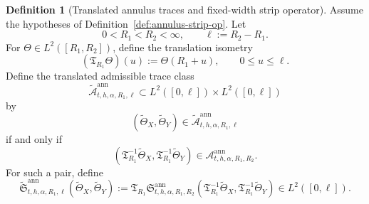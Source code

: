 \documentclass[11pt,a4paper]{amsart}
\theoremstyle{plain}
\theoremstyle{definition}
\newtheorem{definition}[theorem]{Definition}
\theoremstyle{remark}
\begin{document}
\begin{definition}[Translated annulus traces and fixed-width strip operator]
\label{def:annulus-normalized}
Assume the hypotheses of Definition~\ref{def:annulus-strip-op}. Let
\[
0<R_1<R_2<\infty,
\qquad
\ell:=R_2-R_1.
\]
For \(\Theta\in L^2([R_1,R_2])\), define the translation isometry
\[
(\mathfrak T_{R_1}\Theta)(u):=\Theta(R_1+u),
\qquad 0\le u\le \ell.
\]
Define the translated admissible trace class
\[
\widetilde{\mathcal A}_{t,h,\alpha,R_1,\ell}^{\mathrm{ann}}
\subset
L^2([0,\ell])\times L^2([0,\ell])
\]
by
\[
(\widetilde\Theta_X,\widetilde\Theta_Y)\in
\widetilde{\mathcal A}_{t,h,\alpha,R_1,\ell}^{\mathrm{ann}}
\]
if and only if
\[
(\mathfrak T_{R_1}^{-1}\widetilde\Theta_X,\mathfrak T_{R_1}^{-1}\widetilde\Theta_Y)
\in
\mathcal A_{t,h,\alpha,R_1,R_2}^{\mathrm{ann}}.
\]
For such a pair, define
\begin{equation}\label{eq:annulus-normalized-op}
\widetilde{\mathfrak S}_{t,h,\alpha,R_1,\ell}^{\mathrm{ann}}
(\widetilde\Theta_X,\widetilde\Theta_Y)
:=
\mathfrak T_{R_1}
\mathfrak S_{t,h,\alpha,R_1,R_2}^{\mathrm{ann}}
(
\mathfrak T_{R_1}^{-1}\widetilde\Theta_X,
\mathfrak T_{R_1}^{-1}\widetilde\Theta_Y
)
\in
L^2([0,\ell]).
\end{equation}
\end{definition}
\end{document}
